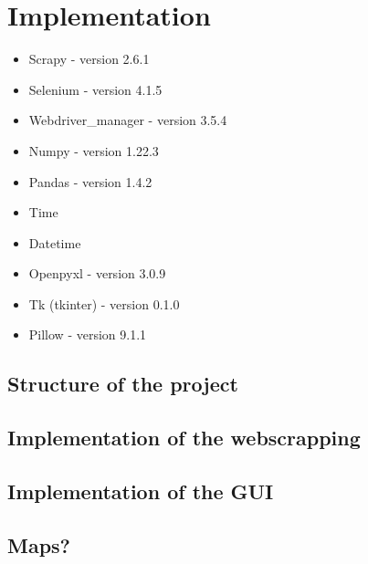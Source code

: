 \documentclass[main]{subfiles}
\begin{document}
\section{Implementation}
\begin{itemize}
    \item Scrapy -  version 2.6.1
    \item Selenium - version 4.1.5
    \item Webdriver\_manager - version 3.5.4
    \item Numpy -  version 1.22.3
    \item Pandas  - version 1.4.2
    \item Time
    \item Datetime
    \item Openpyxl - version 3.0.9
    \item Tk (tkinter) - version 0.1.0
    \item Pillow - version 9.1.1
\end{itemize}

\subsection{Structure of the project}

\subsection{Implementation of the webscrapping}

\subsection{Implementation of the GUI}

\subsection{Maps?}
\end{document}
